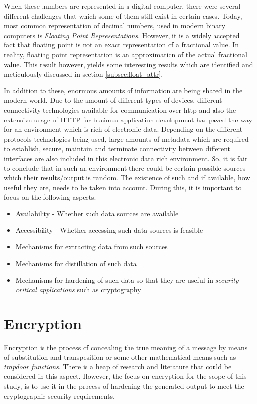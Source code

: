 When these numbers are represented in a digital computer, there were several different challenges that which some of them still exist in certain cases. Today, most common representation of decimal numbers, used in modern binary computers is \textit{Floating Point Representations}. However, it is a widely accepted fact that floating point is not an exact representation of a fractional value. In reality, floating point representation is an approximation of the actual fractional value. This result however, yields some interesting results which are identified and meticulously discussed in section \ref{subsec:float_attr}.

In addition to these, enormous amounts of information are being shared in the modern world. Due to the amount of different types of devices, different connectivity technologies available for communication over \acrfull{http} and also the extensive usage of HTTP for business application development has paved the way for an environment which is rich of electronic data. Depending on the different protocols technologies being used, large amounts of metadata which are required to establish, secure, maintain and terminate connectivity between different interfaces are also included in this electronic data rich environment. So, it is fair to conclude that in such an environment there could be certain possible sources which their results/output is random. The existence of such and if available, how useful they are, needs to be taken into account. During this, it is important to focus on the following aspects.

\begin{itemize}
    \item Availability - Whether such data sources are available
    \item Accessibility - Whether accessing such data sources is feasible
    \item Mechanisms for extracting data from such sources
    \item Mechanisms for distillation of such data
    \item Mechanisms for hardening of such data so that they are useful in \textit{security critical applications} such as cryptography
\end{itemize}

\section{Encryption}

Encryption is the process of concealing the true meaning of a message by means of substitution and transposition or some other mathematical means such as \textit{trapdoor functions}. There is a heap of research and literature that could be considered in this aspect. However, the focus on encryption for the scope of this study, is to use it in the process of hardening the generated output to meet the cryptographic security requirements.

